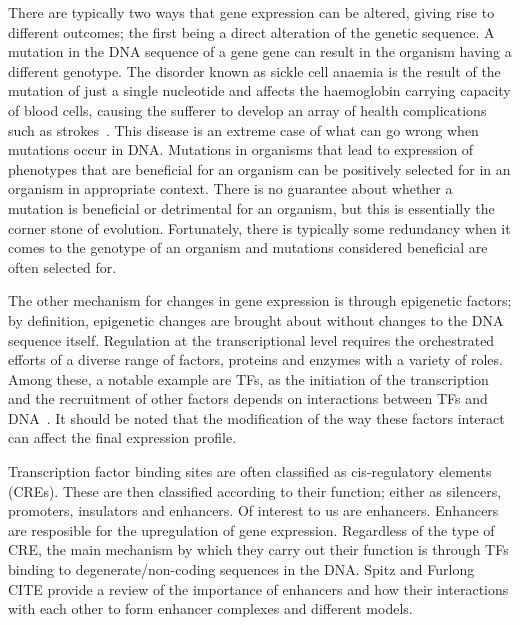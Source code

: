         There are typically two ways that gene expression can be altered, giving rise to different outcomes; the first being a direct alteration of the genetic sequence. A mutation in the DNA sequence of a gene gene can result in the organism having a different genotype. 
        The disorder known as sickle cell anaemia is the result of the mutation of just a single nucleotide and affects the haemoglobin carrying capacity of blood cells, causing the sufferer to develop an array of health complications such as strokes~\cite{clancy2008dna}. This disease is an extreme case of what can go wrong when mutations occur in DNA. Mutations in organisms that lead to expression of phenotypes that are beneficial for an organism can be positively selected for in an organism in appropriate context. There is no guarantee about whether a mutation is beneficial or detrimental for an organism, but  this is essentially the corner stone of evolution. Fortunately, there is typically some redundancy when it comes to the genotype of an organism and mutations considered beneficial are often selected for.
        
        The other mechanism for changes in gene expression is through epigenetic factors; by definition, epigenetic changes are brought about without changes to the DNA sequence itself.
        Regulation at the transcriptional level requires the orchestrated efforts of a diverse range of factors, proteins and enzymes with a variety of roles. Among these, a notable example are TFs, as the initiation of the transcription and the recruitment of other factors depends on interactions between TFs and DNA~\cite{lemon2000orchestrated}. It should be noted that the modification of the way these factors interact can affect the final expression profile. 
        
        Transcription factor binding sites are often classified as cis-regulatory elements (CREs). These are then classified according to their function; either as silencers, promoters, insulators and enhancers. Of interest to us are enhancers. Enhancers are resposible for the upregulation of gene expression. Regardless of the type of CRE, the main mechanism by which they carry out their function is through TFs binding to degenerate/non-coding sequences in the DNA. Spitz and Furlong CITE provide a review of the importance of enhancers and how their interactions with each other to form enhancer complexes and different models. 
        

